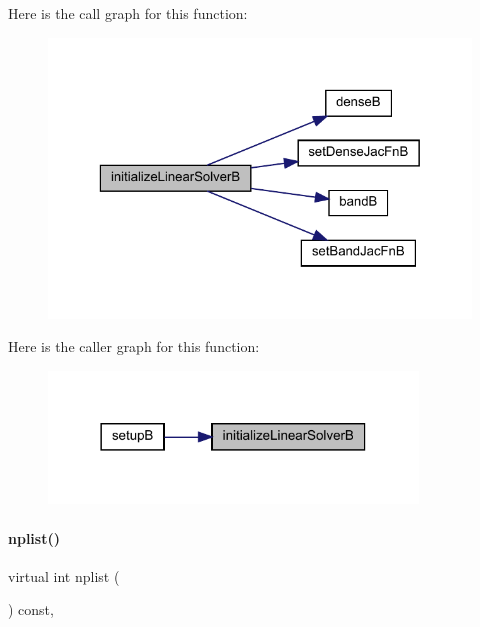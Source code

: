 Here is the call graph for this function\+:
\nopagebreak
\begin{figure}[H]
\begin{center}
\leavevmode
\includegraphics[width=323pt]{classamici_1_1_solver_a4f596731d15be6e9e76a2147aa1cce34_cgraph}
\end{center}
\end{figure}
Here is the caller graph for this function\+:
\nopagebreak
\begin{figure}[H]
\begin{center}
\leavevmode
\includegraphics[width=278pt]{classamici_1_1_solver_a4f596731d15be6e9e76a2147aa1cce34_icgraph}
\end{center}
\end{figure}
\mbox{\label{classamici_1_1_solver_a9a135f04f34dbf45cf980b97e6906665}} 
\paragraph{\texorpdfstring{nplist()}{nplist()}}
{\footnotesize\ttfamily virtual int nplist (\begin{DoxyParamCaption}{ }\end{DoxyParamCaption}) const\hspace{0.3cm}{\ttfamily [protected]}, {}}


